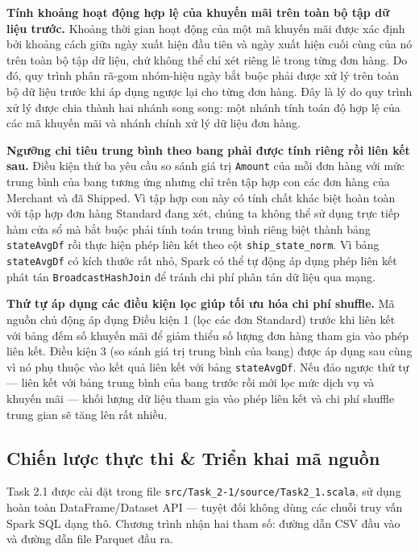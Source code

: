 \textbf{Tính khoảng hoạt động hợp lệ của khuyến mãi trên toàn bộ tập dữ liệu trước.}
Khoảng thời gian hoạt động của một mã khuyến mãi được xác định bởi khoảng cách giữa ngày xuất hiện đầu tiên và ngày xuất hiện cuối cùng của nó trên toàn bộ tập dữ liệu, chứ không thể chỉ xét riêng lẻ trong từng đơn hàng. Do đó, quy trình phân rã-gom nhóm-hiệu ngày bắt buộc phải được xử lý trên toàn bộ dữ liệu trước khi áp dụng ngược lại cho từng đơn hàng. Đây là lý do quy trình xử lý được chia thành hai nhánh song song: một nhánh tính toán độ hợp lệ của các mã khuyến mãi và nhánh chính xử lý dữ liệu đơn hàng.

\textbf{Ngưỡng chi tiêu trung bình theo bang phải được tính riêng rồi liên kết sau.}
Điều kiện thứ ba yêu cầu so sánh giá trị \texttt{Amount} của mỗi đơn hàng với mức trung bình của bang tương ứng nhưng chỉ trên tập hợp con các đơn hàng của Merchant và đã Shipped. Vì tập hợp con này có tính chất khác biệt hoàn toàn với tập hợp đơn hàng Standard đang xét, chúng ta không thể sử dụng trực tiếp hàm cửa sổ mà bắt buộc phải tính toán trung bình riêng biệt thành bảng \texttt{stateAvgDf} rồi thực hiện phép liên kết theo cột \texttt{ship\_state\_norm}. Vì bảng \texttt{stateAvgDf} có kích thước rất nhỏ, Spark có thể tự động áp dụng phép liên kết phát tán \texttt{BroadcastHashJoin} để tránh chi phí phân tán dữ liệu qua mạng.

\textbf{Thứ tự áp dụng các điều kiện lọc giúp tối ưu hóa chi phí shuffle.}
Mã nguồn chủ động áp dụng Điều kiện 1 (lọc các đơn Standard) trước khi liên kết với bảng đếm số khuyến mãi để giảm thiểu số lượng đơn hàng tham gia vào phép liên kết. Điều kiện 3 (so sánh giá trị trung bình của bang) được áp dụng sau cùng vì nó phụ thuộc vào kết quả liên kết với bảng \texttt{stateAvgDf}. Nếu đảo ngược thứ tự — liên kết với bảng trung bình của bang trước rồi mới lọc mức dịch vụ và khuyến mãi — khối lượng dữ liệu tham gia vào phép liên kết và chi phí shuffle trung gian sẽ tăng lên rất nhiều.

\subsection{Chiến lược thực thi \& Triển khai mã nguồn}

Task 2.1 được cài đặt trong file \texttt{src/Task\_2-1/source/Task2\_1.scala}, sử dụng hoàn toàn DataFrame/Dataset API --- tuyệt đối không dùng các chuỗi truy vấn Spark SQL dạng thô. Chương trình nhận hai tham số: đường dẫn CSV đầu vào và đường dẫn file Parquet đầu ra.

